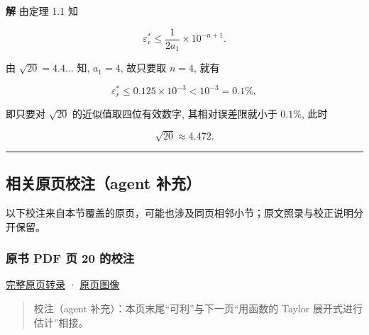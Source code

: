 \documentclass[
  10pt,
  fontset=fandol]{ctexart}
\begin{document}
\textbf{解} 由定理 1.1 知

\[
\varepsilon_r^* \leqslant \frac{1}{2a_1} \times 10^{-n+1}.
\]

由 \(\sqrt{20} = 4.4 \dots\) 知, \(a_1 = 4\), 故只要取 \(n=4\), 就有

\[
\varepsilon_r^* \leqslant 0.125 \times 10^{-3} < 10^{-3} = 0.1\%,
\]

即只要对 \(\sqrt{20}\) 的近似值取四位有效数字, 其相对误差限就小于 \(0.1\%\), 此时

\[
\sqrt{20} \approx 4.472.
\]

\begin{center}\rule{0.5\linewidth}{0.5pt}\end{center}

\subsection{相关原页校注（agent 补充）}\label{ux76f8ux5173ux539fux9875ux6821ux6ce8agent-ux8865ux5145}

以下校注来自本节覆盖的原页，可能也涉及同页相邻小节；原文照录与校正说明分开保留。

\subsubsection{原书 PDF 页 20 的校注}\label{ux539fux4e66-pdf-ux9875-20-ux7684ux6821ux6ce8}

\href{../pages/pdf-020.md}{完整原页转录} · \href{../../source-images/pdf-020.jpeg}{原页图像}

\begin{quote}
校注（agent 补充）：本页末尾``可利''与下一页``用函数的 Taylor 展开式进行估计''相接。
\end{quote}
\end{document}

